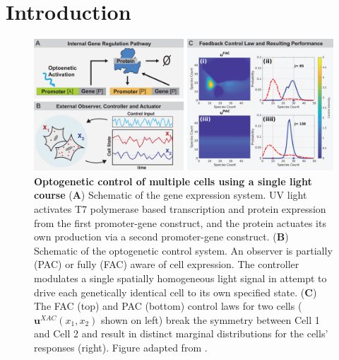 \documentclass[12pt]{article}
\begin{document}
%
%
%
\maketitle
% 

\section{Introduction}
\begin{figure}
\begin{center}
\includegraphics[width=\columnwidth]{CartoonAndControler.pdf}
\caption{{\bf Optogenetic control of multiple cells using a single light course}
({\bf A}) Schematic of the gene expression system. UV light activates T7 polymerase based transcription and protein expression from the first promoter-gene construct, and the protein actuates its own production via a second promoter-gene construct.
({\bf B}) Schematic of the optogenetic control system. An observer is partially (PAC) or fully (FAC) aware of cell expression. The controller modulates a single spatially homogeneous light signal in attempt to drive each genetically identical cell to its own specified state.  
({\bf C}) The FAC (top) and PAC (bottom) control laws for two cells ($\mathbf{u}^{XAC}(x_1,x_2)$ shown on left) break the symmetry between Cell 1 and Cell 2 and result in distinct marginal distributions for the cells' responses (right).
Figure adapted from \cite{May2021}.}
\label{cartoons}
\end{center}
\vspace{-0.3in}
\end{figure}
\end{document}
